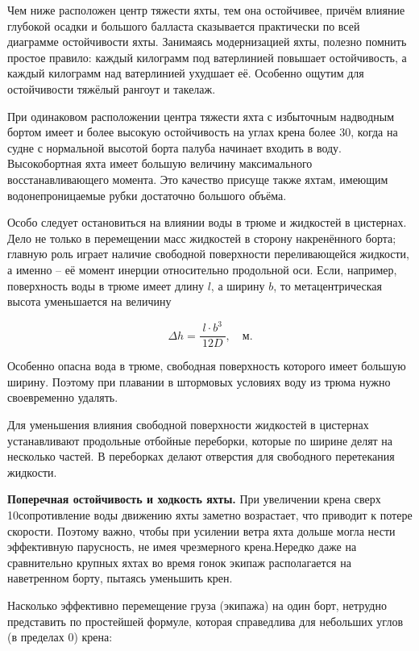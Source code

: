 Чем ниже расположен центр тяжести яхты, тем она остойчивее, причём
влияние глубокой осадки и большого балласта сказывается практически по
всей диаграмме остойчивости яхты. Занимаясь модернизацией яхты,
полезно помнить простое правило: каждый килограмм под ватерлинией
повышает остойчивость, а каждый килограмм над ватерлинией ухудшает
её. Особенно ощутим для остойчивости тяжёлый рангоут и такелаж.

При одинаковом расположении центра тяжести яхта с избыточным надводным
бортом имеет и более высокую остойчивость на углах крена более 30\gr, когда на судне с нормальной высотой борта палуба начинает
входить в воду. Высокобортная яхта имеет большую величину
максимального восстанавливающего момента. Это качество присуще также
яхтам, имеющим водонепроницаемые рубки достаточно большого объёма.

Особо следует остановиться на влиянии воды в трюме и жидкостей в
цистернах. Дело не только в перемещении масс жидкостей в сторону
накренённого борта; главную роль играет наличие свободной поверхности
переливающейся жидкости, а именно \--- её момент инерции относительно
продольной оси. Если, например, поверхность воды в трюме имеет длину
$l$, а ширину $b$, то метацентрическая высота уменьшается на величину

\begin{equation}
  \Delta h = \frac{l \cdot b^3}{\ 12D\ }, \quad \text{м.}
\end{equation}

Особенно опасна вода в трюме, свободная поверхность которого имеет
большую ширину. Поэтому при плавании в штормовых условиях воду из
трюма нужно своевременно удалять.

Для уменьшения влияния свободной поверхности жидкостей в цистернах
устанавливают продольные отбойные переборки,
которые по ширине делят на несколько частей. В переборках делают
отверстия для свободного перетекания жидкости.

\textbf{Поперечная остойчивость и ходкость яхты.}
 При увеличении крена
сверх 10\gr сопротивление воды движению яхты заметно
возрастает, что приводит к потере скорости. Поэтому важно, чтобы при
усилении ветра яхта дольше могла нести эффективную парусность, не имея
чрезмерного крена.Нередко даже на сравнительно крупных яхтах во время
гонок экипаж располагается на наветренном борту, пытаясь уменьшить
крен.

Насколько эффективно перемещение груза (экипажа) на один борт,
нетрудно представить по простейшей формуле, которая справедлива для
небольших углов (в пределах 0\gr) крена:

